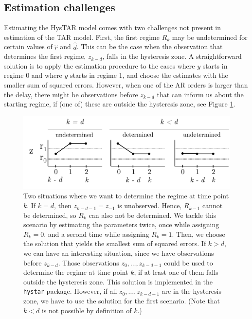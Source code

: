 \documentclass{article}
\begin{document}
\subsection{Estimation challenges}
Estimating the HysTAR model comes with two challenges not present in estimation of the TAR model.
First, the first regime $R_k$ may be undetermined for certain values of $\hat{r}$ and $\hat{d}$. 
This can be the case when the observation that determines the first regime, $z_{k-d}$, falls in the hysteresis zone.
A straightforward solution is to apply the estimation procedure to the cases where $y$ starts in regime 0 and where $y$ starts in regime 1, and choose the estimates with the smaller sum of squared errors.
However, when one of the AR orders is larger than the delay, there might be observations before $z_{k-d}$ that can inform us about the starting regime, if (one of) these are outside the hysteresis zone, see Figure \ref{fig:unknown_start}.

\begin{figure}
\begin{center}
\includegraphics[scale=.6]{unknown_start}
\caption{Two situations where we want to determine the regime at time point $k$. 
If $k = d$, then $z_{k-d-1} = z_{-1}$ is unobserved. Hence, $R_{k-1}$ cannot be determined, so $R_{k}$ can also not be determined. We tackle this scenario by estimating the parameters twice, once while assigning $R_k = 0$, and a second time while assigning $R_k = 1$. Then, we choose the solution that yields the smallest sum of squared errors.
If $k > d$, we can have an interesting situation, since we have observations before $z_{k-d}$. 
Those observations $z_{0}, \dots, z_{k - d - 1}$ could be used to determine the regime at time point $k$, if at least one of them falls outside the hysteresis zone. 
This solution is implemented in the \texttt{hystar} package. 
However, if all $z_{0}, \dots, z_{k - d - 1}$ are in the hysteresis zone, we have to use the solution for the first scenario. (Note that $k < d$ is not possible by definition of $k$.)}
\label{fig:unknown_start}
\end{center}
\end{figure}
\end{document}
